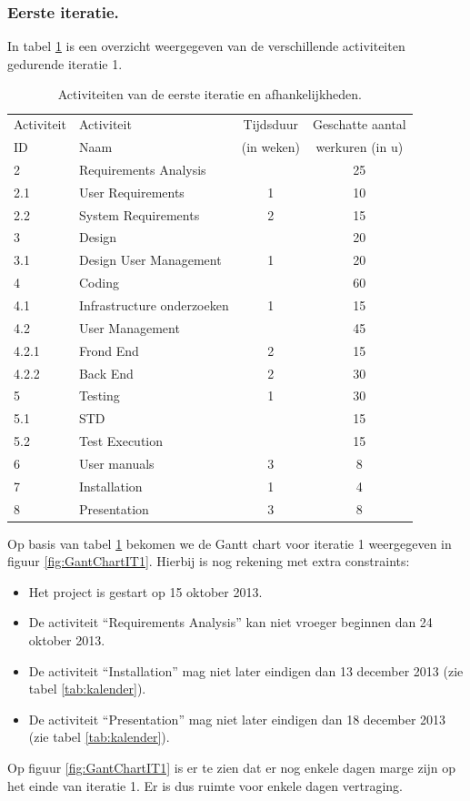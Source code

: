 \subsubsection{Eerste iteratie.}
In tabel \ref{tab:ActivityDependenciesIteratie1} is een overzicht weergegeven van de verschillende activiteiten gedurende iteratie 1.
\begin{table} [H]
	\centering
	\caption{Activiteiten van de eerste iteratie en afhankelijkheden.}
	\begin{tabular} {l|l|c|c}
		Activiteit & Activiteit & Tijdsduur & Geschatte aantal  \\
		ID & Naam & (in weken) & werkuren (in u) \\
		\hline
		2 	& Requirements Analysis 		&   & 25   	\\
		2.1 & User Requirements 			& 1 & 10  	\\
		2.2 & System Requirements 		& 2 & 15  	\\
		\hline
		3 	& Design 					&   & 20 	\\
		3.1 & Design User Management 	& 1 & 20 	\\
		\hline
		4 	& Coding 					&   & 60 	\\
		4.1 & Infrastructure onderzoeken & 1 & 15	\\
		4.2 & User Management			&   & 45   	\\
		4.2.1 & Frond End 		 		& 2 & 15  	\\
		4.2.2 & Back End					& 2 & 30 	\\
		\hline
		5 	& Testing 					& 1 & 30  	\\
		5.1 & STD						&   & 15  	\\
		5.2 & Test Execution				&   & 15  	\\
		\hline
		6 	& User manuals 				& 3 & 8  	\\
		\hline
		7 	& Installation 				& 1 & 4  	\\
		\hline
		8 	& Presentation 				& 3 & 8 		\\
	\end{tabular}
	\label{tab:ActivityDependenciesIteratie1}
\end{table}
Op basis van tabel \ref{tab:ActivityDependenciesIteratie1} bekomen we de Gantt chart voor iteratie 1 weergegeven in figuur \ref{fig:GantChartIT1}. Hierbij is nog rekening met extra constraints:
\begin{itemize}
	\item Het project is gestart op 15 oktober 2013.
	\item De activiteit ``Requirements Analysis'' kan niet vroeger beginnen dan 24 oktober 2013.
	\item De activiteit ``Installation'' mag niet later eindigen dan 13 december 2013 (zie tabel \ref{tab:kalender}).
	\item De activiteit ``Presentation'' mag niet later eindigen dan 18 december 2013 (zie tabel \ref{tab:kalender}).
\end{itemize}
Op figuur \ref{fig:GantChartIT1} is er te zien dat er nog enkele dagen marge zijn op het einde van iteratie 1. Er is dus ruimte voor enkele dagen vertraging.

